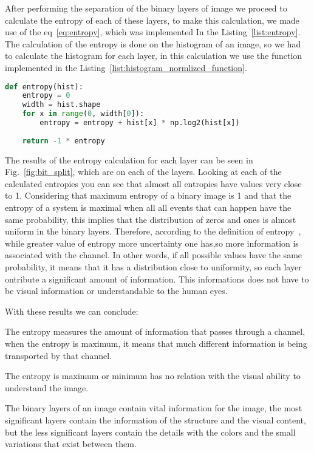 \documentclass[journal]{IEEEtran}
\begin{document}
After performing the separation of the binary layers of image we proceed to calculate the entropy of each of these layers, to make this calculation, we made use of the eq~\ref{eq:entropy}, which was implemented In the Listing~\ref{list:entropy}. The calculation of the entropy is done on the histogram of an image, so we had to calculate the histogram for each layer, in this calculation we use the function implemented in the Listing~\ref{list:histogram_normlized_function}.

\begin{lstlisting}[language=Python, caption=Bit spliting, label=list:entropy]
def entropy(hist):
	entropy = 0
	width = hist.shape
	for x in range(0, width[0]):
		entropy = entropy + hist[x] * np.log2(hist[x])
	
	return -1 * entropy
\end{lstlisting}

The results of the entropy calculation for each layer can be seen in Fig.~\ref{fig:bit_split}, which are on each of the layers. Looking at each of the calculated entropies you can see that almost all entropies have values ​​very close to 1. Considering that maximum entropy of a binary image is 1 and that the entropy of a system is maximal when all all events that can happen have the same probability, this implies that the distribution of zeros and ones is almost uniform in the binary  layers. Therefore, according to the definition of entropy~\cite{Pedrini2008}, while greater value of entropy more uncertainty one has,so more information is associated with the channel. In other words, if all possible values have the same probability, it means that it has a distribution close to uniformity, so each layer ontribute a significant amount of information. This informations does not have to be visual information or understandable to the human eyes.

With these results we can conclude: 
\begin{enumerate*}
	\item The entropy measures the amount of information that passes through a channel, when the entropy is maximum, it means that much different information is being transported by that channel.
	\item The entropy is maximum or minimum has no relation with the visual ability to understand the image.
	\item The binary layers of an image contain vital information for the image, the most significant layers contain the information of the structure and the visual content, but the less significant layers contain the details with the colors and the small variations that exist between them.
\end{enumerate*}
\end{document}
